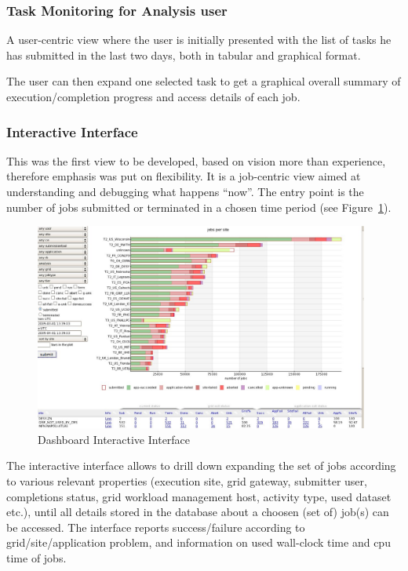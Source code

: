 \subsubsection{Task Monitoring for Analysis user}
A user-centric view where the user is
initially presented with the list of tasks he has submitted in the last
two days, both in tabular and graphical format.%

The user can then expand one selected task to get
a graphical overall summary of execution/completion progress
and access details of each job.%


\subsubsection{Interactive Interface}
This was the first view to be developed, based on
vision more than experience, therefore
emphasis was put on flexibility. It is a job-centric view
aimed at understanding and debugging what happens ``now''.
The entry point is the number of jobs submitted or
terminated in a chosen time period (see Figure~\ref{fig:Dashboard}).
\begin{figure}
 \includegraphics[width=0.98\textwidth]{DashboardInteractive.eps}
\caption{Dashboard Interactive Interface}
\label{fig:Dashboard}
\end{figure}
The interactive interface allows to drill down expanding the set of jobs according to various relevant properties (execution site, grid gateway,
submitter user, completions status, grid workload management host,
activity type, used dataset etc.), until all details stored in the database
about a choosen (set of) job(s) can be accessed.
The interface reports success/failure according to grid/site/application problem, and information on used wall-clock time and cpu time of jobs.


